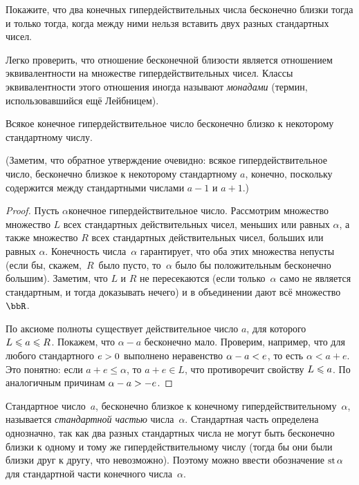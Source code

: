 \begin{problem}
Покажите, что два конечных гипердействительных числа
бесконечно близки тогда и только тогда, когда между
ними нельзя вставить двух разных стандартных чисел.
\end{problem}

Легко проверить, что отношение бесконечной близости является
отношением эквивалентности на множестве гипердействительных
чисел. Классы эквивалентности этого отношения иногда называют
\emph{монадами}%
(термин, использовавшийся ещё Лейбницем).%

\begin{theorem}\label{standard-part}
Всякое конечное гипердействительное число
бесконечно близко к некоторому стандартному числу.%
%
\end{theorem}

(Заметим, что обратное утверждение очевидно: всякое
гипердействительное число, бесконечно близкое к некоторому
стандартному $a$, конечно, поскольку содержится между
стандартными числами $a-1$ и $a+1$.)

\begin{proof}
Пусть $\alpha$\т конечное гипердействительное число. Рассмотрим
множество множество $L$ всех стандартных действительных чисел,
меньших или равных $\alpha$, а также множество $R$ всех
стандартных действительных чисел, больших или равных $\alpha$.
Конечность числа~$\alpha$ гарантирует, что оба этих множества
непусты (если бы, скажем,~$R$~было пусто, то~$\alpha$ было бы
положительным бесконечно большим). Заметим, что $L$ и $R$ не
пересекаются (если только~$\alpha$ само не является стандартным,
и тогда доказывать нечего) и в объединении дают всё множество~$\bbR$.

По аксиоме полноты существует действительное число $a$, для
которого $L\hm\le a \hm\le R$. Покажем, что $\alpha-a$
бесконечно мало. Проверим, например, что для любого стандартного
$e\hm>0$ выполнено неравенство $\alpha-a\hm<e$, то есть
$\alpha<a+e$. Это понятно: если $a+e\le\alpha$, то $a+e\in
L$, что противоречит свойству $L\hm\le a$. По аналогичным
причинам $\alpha-a\hm>-e$.
\end{proof}

Стандартное число~$a$, бесконечно близкое к конечному
гипердействительному~$\alpha$, называется \emph{стандартной
частью}%
%
числа~$\alpha$. Стандартная часть определена однозначно,
так как два разных стандартных числа не могут быть бесконечно
близки к одному и тому же гипердействительному числу (тогда бы
они были близки друг к другу, что невозможно). Поэтому можно
ввести обозначение $\operatorname{st}\alpha$ для стандартной части конечного
числа~$\alpha$.

